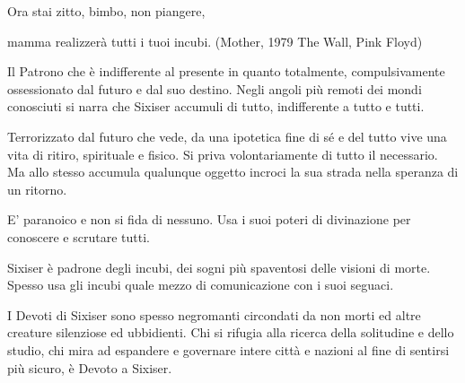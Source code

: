 \begin{multicols}{2}
\begin{changemargin}{0.3cm}{0.3cm}
\begin{enfasi}
{\medskip

Ora stai zitto, bimbo, non piangere,

mamma realizzerà tutti i tuoi incubi. (Mother, 1979 The Wall, Pink Floyd)

}\end{enfasi}\end{changemargin}\medskip

Il Patrono che è indifferente al presente in quanto totalmente, compulsivamente ossessionato dal futuro e dal suo destino. Negli angoli più remoti dei mondi conosciuti si narra che Sixiser accumuli di tutto, indifferente a tutto e tutti.

Terrorizzato dal futuro che vede, da una ipotetica fine di sé e del tutto vive una vita di ritiro, spirituale e fisico. Si priva volontariamente di tutto il necessario. Ma allo stesso accumula qualunque oggetto incroci la sua strada nella speranza di un ritorno.

E' paranoico e non si fida di nessuno. Usa i suoi poteri di divinazione per conoscere e scrutare tutti.

Sixiser è padrone degli incubi, dei sogni più spaventosi delle visioni di morte. Spesso usa gli incubi quale mezzo di comunicazione con i suoi seguaci.

I Devoti di Sixiser sono spesso negromanti circondati da non morti ed altre creature silenziose ed ubbidienti. Chi si rifugia alla ricerca della solitudine e dello studio, chi mira ad espandere e governare intere città e nazioni al fine di sentirsi più sicuro, è Devoto a Sixiser.


\end{multicols}
